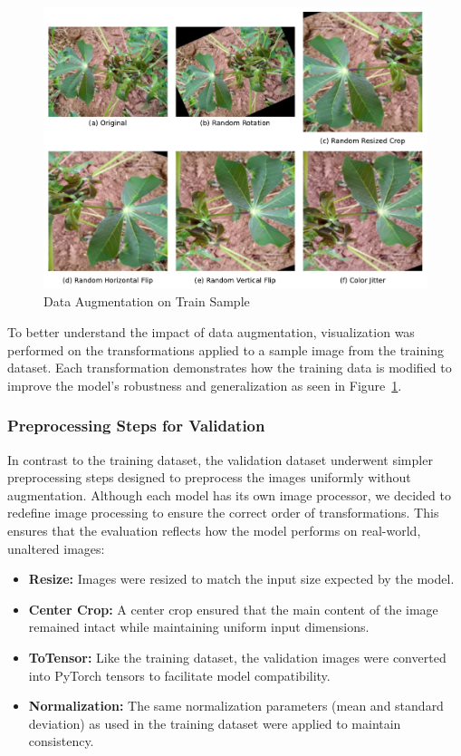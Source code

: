 \begin{figure}[t]
    \centering
    \includegraphics[width=1.0\linewidth]{graphs/overview/TrainTransform.pdf}
    \caption{Data Augmentation on Train Sample}
    \label{fig:TrainAug2}
\end{figure}

To better understand the impact of data augmentation, visualization was performed on the transformations applied to a sample image from the training dataset. Each transformation demonstrates how the training data is modified to improve the model's robustness and generalization as seen in Figure~\ref{fig:TrainAug2}.

\subsubsection{Preprocessing Steps for Validation}

In contrast to the training dataset, the validation dataset underwent simpler preprocessing steps designed to preprocess the images uniformly without augmentation. Although each model has its own image processor, we decided to redefine image processing to ensure the correct order of transformations. This ensures that the evaluation reflects how the model performs on real-world, unaltered images:
\begin{itemize}
    \item \textbf{Resize:} Images were resized to match the input size expected by the model.
    \item \textbf{Center Crop:} A center crop ensured that the main content of the image remained intact while maintaining uniform input dimensions.
    \item \textbf{ToTensor:} Like the training dataset, the validation images were converted into PyTorch tensors to facilitate model compatibility.
    \item \textbf{Normalization:} The same normalization parameters (mean and standard deviation) as used in the training dataset were applied to maintain consistency.
\end{itemize}

